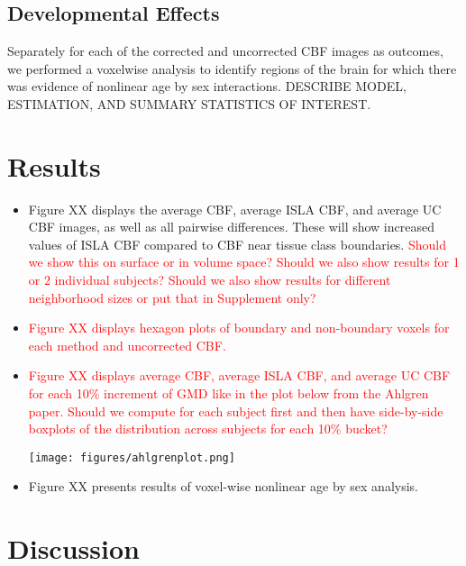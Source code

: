 \documentclass[review]{elsarticle}
\begin{document}
\subsection{Developmental Effects}
\label{subsec:flameo}

Separately for each of the corrected and uncorrected CBF images as outcomes, we performed a voxelwise analysis to identify regions of the brain for which there was evidence of nonlinear age by sex interactions. DESCRIBE MODEL, ESTIMATION, AND SUMMARY STATISTICS OF INTEREST.


\section{Results}
\label{sec:Results}   

\begin{itemize}
\item Figure XX displays the average CBF, average ISLA CBF, and average UC CBF images, as well as all pairwise differences. These will show increased values of ISLA CBF compared to CBF near tissue class boundaries. \textcolor{red}{Should we show this on surface or in volume space? Should we also show results for 1 or 2 individual subjects? Should we also show results for different neighborhood sizes or put that in Supplement only?}

\item \textcolor{red}{Figure XX displays hexagon plots of boundary and non-boundary voxels for each method and uncorrected CBF.}

\item \textcolor{red}{Figure XX displays average CBF, average ISLA CBF, and average UC CBF for each 10\% increment of GMD like in the plot below from the Ahlgren paper. Should we compute for each subject first and then have side-by-side boxplots of the distribution across subjects for each 10\% bucket?}

\begin{center}
\texttt{[image: figures/ahlgrenplot.png]}
\end{center}


\item Figure XX presents results of voxel-wise nonlinear age by sex analysis.
\end{itemize}

\section{Discussion}
\label{sec:Discussion}
\end{document}
